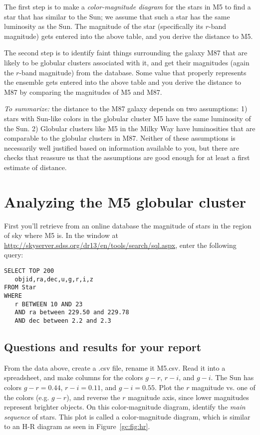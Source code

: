 The first step is to make a \textit{color-magnitude diagram} for the stars in M5 to find a star that
has similar to the Sun; we assume that such a star has the same luminosity as the Sun. The
magnitude of the star (specifically its $r$-band magnitude) gets entered into the above table,
and you derive the distance to M5.

The second step is to identify faint things surrounding the galaxy M87 that are likely to be
globular clusters associated with it, and get their magnitudes (again the $r$-band magnitude)
from the database. Some value that properly represents the ensemble gets entered into the
above table and you derive the distance to M87 by comparing the magnitudes of M5 and M87.

\textit{To summarize:} the distance to the M87 galaxy depends on two assumptions: 1) stars
with Sun-like colors in the globular cluster M5 have the same luminosity of the Sun. 2)
Globular clusters like M5 in the Milky Way have luminosities that are comparable to
the globular clusters in M87. Neither of these assumptions is necessarily well justified based on information available to you, but there are checks that reassure us that the assumptions
are good enough for at least a first estimate of distance.

\section{Analyzing the M5 globular cluster}

First you'll retrieve from an online database the magnitude of stars in the region of sky where M5 is. In the window at \url{http://skyserver.sdss.org/dr13/en/tools/search/sql.aspx}, enter the following query:

\begin{verbatim}
SELECT TOP 200
   objid,ra,dec,u,g,r,i,z
FROM Star
WHERE
   r BETWEEN 10 AND 23
   AND ra between 229.50 and 229.78
   AND dec between 2.2 and 2.3
\end{verbatim}

\subsection{Questions and results for your report}

\begin{steps}
	\item From the data above, create a .csv file, rename it M5.csv. Read it into
	a spreadsheet, and make columns for the colors $g - r$, $r - i$, and $g - i$. The Sun has
	colors $g - r = 0.44$, $r - i = 0.11$, and $g - i = 0.55$. Plot the $r$ magnitude vs. one of the colors (e.g.
	$g - r$), and reverse the $r$ magnitude axis, since lower magnitudes represent brighter objects. On this color-magnitude diagram, identify
	the \textit{main sequence} of stars. This plot is called a color-magnitude diagram, which is similar to an H-R diagram as seen in Figure~\ref{gc:fig:hr}.
\end{steps}

